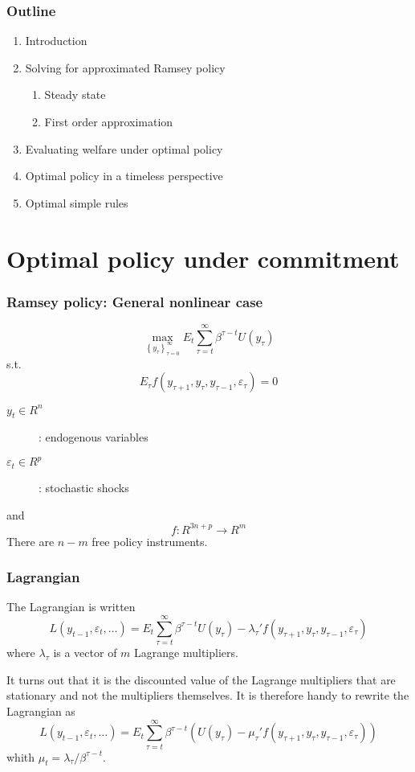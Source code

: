 \documentclass{beamer}
\begin{document}
\begin{frame}
  \frametitle{Outline}
  \begin{enumerate}
  \item Introduction
  \item {\red Solving for approximated Ramsey policy}
    \begin{enumerate}
    \item Steady state
    \item First order approximation
    \end{enumerate}
  \item Evaluating welfare under optimal policy
  \item Optimal policy in a timeless perspective
  \item Optimal simple rules
  \end{enumerate}
\end{frame}

\section{Optimal policy under commitment}

\begin{frame}
  \frametitle{Ramsey policy: General nonlinear case}
\[
\max_{\left\{y_\tau\right\}_{\tau=0}^\infty}E_t\sum_{\tau=t}^\infty\beta^{\tau-t}U(y_\tau)
\]
s.t.
\[
E_{\tau}f(y_{\tau+1}, y_{\tau}, y_{\tau-1}, \varepsilon_{\tau})=0
\]
  \begin{description}
  \item[$y_t\in R^n$]: endogenous variables
  \item[$\varepsilon_t\in R^p$]: stochastic shocks
  \end{description}
  and
  \[
  f : R^{3n+p}\rightarrow R^m
  \]
  There are $n-m$ free policy instruments.
\end{frame}

\begin{frame}
  \frametitle{Lagrangian}
The Lagrangian is written
\[
L\left(y_{t-1},\varepsilon_t,\ldots\right) = E_t\sum_{\tau=t}^\infty\beta^{\tau-t}U(y_\tau)-\lambda_\tau'f\left(y_{\tau+1}, y_{\tau}, y_{\tau-1}, \varepsilon_{\tau}\right)
\]
where $\lambda_\tau$ is a vector of $m$ Lagrange multipliers.

It turns out that it is the discounted value of the Lagrange
multipliers that are stationary and not the multipliers themselves. It
is therefore handy to rewrite the Lagrangian as
\[
L\left(y_{t-1},\varepsilon_t,\ldots\right) = E_t\sum_{\tau=t}^\infty\beta^{\tau-t}\left(U(y_\tau)-\mu_\tau'f\left(y_{\tau+1}, y_{\tau}, y_{\tau-1}, \varepsilon_{\tau}\right)\right)
\]
whith $\mu_t=\lambda_\tau/\beta^{\tau-t}$.

\end{frame}
\end{document}
